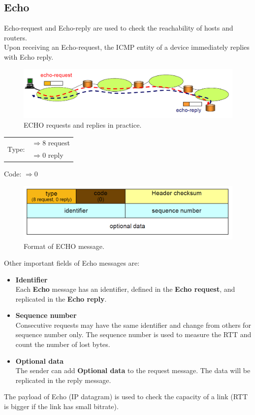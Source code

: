 \subsection{Echo}
Echo-request and Echo-reply are used to check the reachability of hosts and routers.\\
Upon receiving an Echo-request, the ICMP entity of a device immediately replies with Echo reply.
\begin{figure}[H]
\centering
\includegraphics[scale=0.35, angle=0]{./Images/ICMP/ECHO_working}
\caption{\footnotesize{ECHO requests and replies in practice.}}
\end{figure}
\begin{table}[H]
\centering \footnotesize
\begin{tabular}{c|l}
\multirow{2}{*}{Type:} & {$\Rightarrow 8$ request}\\
& {$\Rightarrow 0$ reply}\\
\end{tabular}
\end{table}
\begin{center}
Code: $\Rightarrow 0$\\
\end{center}
\begin{figure}[H]
\centering
\includegraphics[scale=0.35, angle=0]{./Images/ICMP/ECHO_format}
\caption{\footnotesize{Format of ECHO message.}}
\end{figure}
Other important fields of Echo messages are:
\begin{itemize}
\item{\textbf{Identifier}\\
Each \textbf{Echo} message has an identifier, defined in the \textbf{Echo request}, and replicated in the \textbf{Echo reply}.
}
\item{\textbf{Sequence number}\\
Consecutive requests may have the same identifier and change from others for sequence number only. The sequence number is used to measure the RTT and count the number of lost bytes.
}
\item{\textbf{Optional data}\\
The sender can add \textbf{Optional data} to the request message. The data will be replicated in the reply message.
}
\end{itemize}
The payload of Echo (IP datagram) is used to check the capacity of a link (RTT is bigger if the link has small bitrate).

